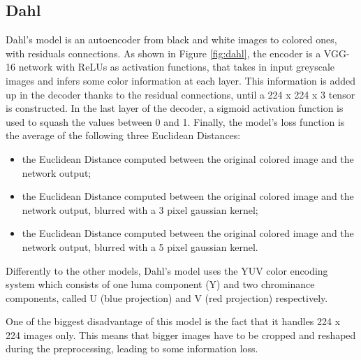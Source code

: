 \subsection{Dahl}

Dahl's model is an autoencoder from black and white images to colored ones, with
residuals connections.
As shown in Figure \ref{fig:dahl}, the encoder is a VGG-16 network with ReLUs as activation functions, that takes in input greyscale images and infers
some color information at each layer. This information is added up in the decoder thanks to the residual
connections, until a 224 x 224 x 3 tensor is constructed. In the last layer of the decoder, a sigmoid activation
function is used to squash the values between 0 and 1.
Finally, the model's loss function is the average of the following three Euclidean Distances:
\begin{itemize}
    \item the Euclidean Distance computed between the original colored image and the network output;
    \item the Euclidean Distance computed between the original colored image and the network output, blurred with a 3 pixel gaussian kernel;
    \item the Euclidean Distance computed between the original colored image and the network output, blurred with a 5 pixel gaussian kernel.
\end{itemize}

Differently to the other models, Dahl's model uses the YUV color encoding system which consists of one luma
component (Y) and two chrominance components, called U (blue projection) and V (red projection) respectively.

One of the biggest disadvantage of this model is the fact that it handles 224 x 224 images only. This means that
bigger images have to be cropped and reshaped during the preprocessing, leading to some information loss.


